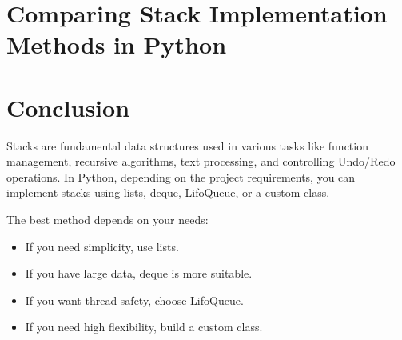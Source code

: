 \documentclass{article}
\begin{document}
\section{Comparing Stack Implementation Methods in Python}

\section{Conclusion}

Stacks are fundamental data structures used in various tasks like function management, recursive algorithms, text processing, and controlling Undo/Redo operations. In Python, depending on the project requirements, you can implement stacks using lists, deque, LifoQueue, or a custom class.

The best method depends on your needs:

\begin{itemize}
    \item If you need simplicity, use lists.
    \item If you have large data, deque is more suitable.
    \item If you want thread-safety, choose LifoQueue.
    \item If you need high flexibility, build a custom class.
\end{itemize}
\end{document}
